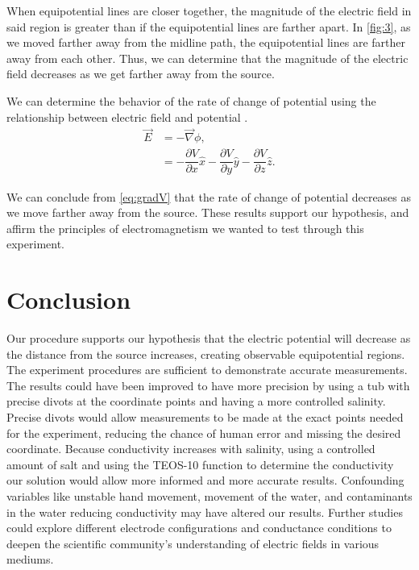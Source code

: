 ﻿\documentclass[10pt,journal,twoside]{IEEEtran}
\begin{document}
When equipotential lines are closer together, the magnitude of the electric field in said region is greater than if the equipotential lines are farther apart. In \cref{fig:3}, as we moved farther away from the midline path, the equipotential lines are farther away from each other. Thus, we can determine that the magnitude of the electric field decreases as we get farther away from the source.

We can determine the behavior of the rate of change of potential using the relationship between electric field and potential \cite{tipler}.
\begin{align}
\vec{E} &= - \vec{\nabla} \phi, \\
&= - \dfrac{\partial V}{\partial x} \hat{x} - \dfrac{\partial V}{\partial y} \hat{y} - \dfrac{\partial V}{\partial z} \hat{z}.
\label{eq:gradV}
\end{align}

We can conclude from \cref{eq:gradV} that the rate of change of potential decreases as we move farther away from the source. These results support our hypothesis, and affirm the principles of electromagnetism we wanted to test through this experiment. 





\section{Conclusion}
Our procedure supports our hypothesis that the electric potential will decrease as the distance from the source increases, creating observable equipotential regions. The experiment procedures are sufficient to demonstrate accurate measurements. The results could have been improved to have more precision by using a tub with precise divots at the coordinate points and having a more controlled salinity. Precise divots would allow measurements to be made at the exact points needed  for the experiment, reducing the chance of human error and missing the desired coordinate. Because conductivity increases with salinity, using a controlled amount of salt and using the TEOS-10 function \cite{heilman-2023-data} to determine the conductivity our solution would allow more informed and more accurate results. Confounding variables like unstable hand movement, movement of the water, and contaminants in the water reducing conductivity may have altered our results. Further studies could explore different electrode configurations and conductance conditions to deepen the scientific community’s understanding of electric fields in various mediums.
        
\end{document}
